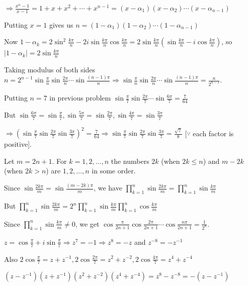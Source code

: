   $\Rightarrow \frac{x^n - 1}{x - 1} = 1 + x + x^2 + \cdots + x^{n - 1} = (x - \alpha_1)(x - \alpha_2)\cdots(x
  - \alpha_{n - 1})$

  Putting $x = 1$ gives us $n = (1 - \alpha_1)(1 - \alpha_2)\cdots(1 - \alpha_{n - 1})$

  Now $1 - \alpha_k = 2\sin^2\frac{k\pi}{n} - 2i\sin\frac{k\pi}{n}\cos\frac{k\pi}{n} =
  2\sin\frac{k\pi}{n}\left(\sin\frac{k\pi}{n} - i\cos\frac{k\pi}{n}\right)$, so $|1 - \alpha_k| =
  2\sin\frac{k\pi}{n}$

  Taking modulus of both sides $n = 2^{n - 1}\sin\frac{\pi}{n}\sin\frac{2\pi}{n}\cdots\sin\frac{(n -
    1)\pi}{n} \Rightarrow \sin\frac{\pi}{n}\sin\frac{2\pi}{n}\cdots\sin\frac{(n - 1)\pi}{n} = \frac{n}{2^{n -
      1}}$.
\item Putting $n = 7$ in previous problem $\sin\frac{\pi}{7}\sin\frac{2\pi}{7}\cdots\sin\frac{6\pi}{7} =
  \frac{7}{64}$

  But $\sin\frac{6\pi}{7} = \sin\frac{\pi}{7}, \sin\frac{5\pi}{7} = \sin\frac{2\pi}{7}, \sin\frac{4\pi}{7} =
  \sin\frac{3\pi}{7}$

  $\Rightarrow \left(\sin\frac{\pi}{7}\sin\frac{2\pi}{7}\sin\frac{3\pi}{7}\right)^2 = \frac{7}{64}
  \Rightarrow \sin\frac{\pi}{7}\sin\frac{2\pi}{7}\sin\frac{3\pi}{7} = \frac{\sqrt{7}}{8}$ [$\because$ each
  factor is positive].
\item Let $m = 2n + 1$. For $k = 1, 2, \ldots, n$ the numbers $2k$ (when $2k\leq n$) and $m - 2k$ (when $2k >
  n$) are $1, 2, \ldots, n$ in some order.

  Since $\sin\frac{2k\pi}{m} = \sin\frac{(m - 2k)\pi}{m}$, we have $\prod_{k = 1}^n\sin\frac{2k\pi}{m} =
  \prod_{k = 1}^n\sin\frac{k\pi}{m}$

  But $\prod_{k = 1}^n\sin\frac{2k\pi}{m} = 2^n\prod_{k = 1}^n\sin\frac{k\pi}{m}\prod_{k =
    1}^n\cos\frac{k\pi}{m}$

  Since $\prod_{k = 1}^n\sin\frac{k\pi}{m}\neq 0$, we get $\cos\frac{\pi}{2n + 1}\cos\frac{2\pi}{2n +
    1}\cdots\cos\frac{n\pi}{2n + 1} = \frac{1}{2^n}$.
\item $z = \cos\frac{\pi}{7} + i\sin\frac{\pi}{7} \Rightarrow z^7 = -1 \Rightarrow z^8 = -z$ and $z^{-8} =
  -z^{-1}$

  Also $2\cos\frac{\pi}{7} = z + z^{-1}, 2\cos\frac{2\pi}{7} = z^2 + z^{-2}, 2\cos\frac{4\pi}{7} = z^4 +
  z^{-4}$

  $\left(z - z^{-1}\right)\left(z + z^{-1}\right)\left(z^2 + z^{-2}\right)\left(z^4 + z^{-4}\right) = z^8 -
  z^{-8} = -\left(z - z^{-1}\right)$

